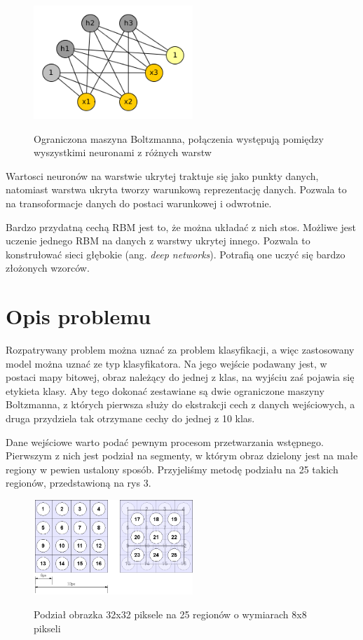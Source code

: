 \documentclass[a4paper,10pt]{article} %
\begin{document}
\begin{figure}
 \centering
 \includegraphics[width=6cm]{imgs/rbm.png}
 \label{fig:rbm}
\caption{Ograniczona maszyna Boltzmanna, połączenia występują pomiędzy wyszystkimi neuronami z różnych
warstw}
\end{figure} 

Wartosci neuronów na warstwie ukrytej traktuje się jako punkty danych, natomiast warstwa ukryta tworzy
warunkową reprezentację danych. Pozwala to na transoformacje danych do postaci warunkowej i odwrotnie.

Bardzo przydatną cechą RBM jest to, że można układać z nich stos. Możliwe jest uczenie jednego RBM na
danych z warstwy ukrytej innego. Pozwala to konstrułować sieci głębokie (ang. \textit{deep networks}).
Potrafią one uczyć się bardzo złożonych wzorców.

\section{Opis problemu}

Rozpatrywany problem można uznać za problem klasyfikacji, a więc zastosowany model można uznać ze typ klasyfikatora. Na jego wejście podawany jest, w postaci mapy bitowej, obraz należący do jednej z klas, na wyjściu zaś pojawia się etykieta klasy. Aby tego dokonać zestawiane są dwie ograniczone maszyny Boltzmanna, z których pierwsza służy do ekstrakcji cech z danych wejściowych, a druga przydziela tak otrzymane cechy do jednej z 10 klas.

Dane wejściowe warto podać pewnym procesom przetwarzania wstępnego. Pierwszym z nich jest podział na segmenty, w którym obraz dzielony jest na małe regiony w pewien ustalony sposób. Przyjeliśmy metodę podziału na 25 takich regionów, przedstawioną na rys 3.

\begin{figure}
 \centering
 \includegraphics[width=6cm]{imgs/segmentacja.png}
 \label{fig:segmentacja}
 \caption{Podział obrazka 32x32 piksele na 25 regionów o wymiarach 8x8 pikseli \cite{cifar}}
\end{figure}
\end{document}
